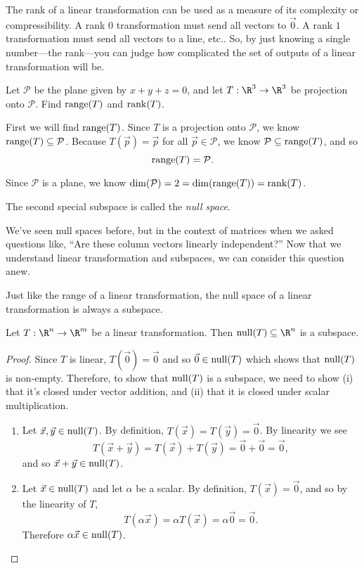The rank of a linear transformation can be used as a measure of
its complexity or compressibility. A rank $0$ transformation must send all vectors to $\vec 0$. A rank
$1$ transformation must send all vectors to a line, etc.. So, by just knowing a single number---the rank---you
can judge how complicated the set of outputs of a linear transformation will be.

\begin{example}
	Let $\mathcal P$ be the plane given by $x+y+z=0$, and let $T:\R^3\to\R^3$ be projection onto $\mathcal P$.
	Find $\operatorname{range}(T)$ and $\operatorname{rank}(T)$.

	First we will find $\operatorname{range}(T)$. Since $T$ is a projection onto $\mathcal P$, we know $\operatorname{range}(T)\subseteq \mathcal P$.
	Because $T(\vec p)=\vec p$ for all $\vec p\in \mathcal P$, we know $\mathcal P\subseteq \operatorname{range}(T)$, and so
	\[
		\operatorname{range}(T)=\mathcal P.
	\]

	Since $\mathcal P$ is a plane, we know $\operatorname{dim}(\mathcal P)=2=\operatorname{dim}(\operatorname{range}(T))=\operatorname{rank}(T)$.
\end{example}

The second special subspace is called the \emph{null space}.


We've seen null spaces before, but in the context of matrices when we asked questions like, ``Are these column vectors
linearly independent?'' Now that we understand linear transformation and subspaces,
we can consider this question anew.

Just like the range of a linear transformation, the null space of a linear transformation is always a subspace.

\begin{theorem}
	Let $T:\R^n\to\R^m$ be a linear transformation. Then $\Null(T)\subseteq \R^n$ is a subspace.
\end{theorem}
\begin{proof}
	Since $T$ is linear, $T(\vec 0)=\vec 0$ and so $\vec 0\in\operatorname{null}(T)$ which shows that $\operatorname{null}(T)$ is non-empty.
	Therefore, to show that $\operatorname{null}(T)$ is a subspace, we need to show (i) that it's closed under vector addition,
	and (ii) that it is closed under scalar multiplication.
	\begin{enumerate}[label=(\roman*)]
		\item Let $\vec x,\vec y\in\operatorname{null}(T)$.
			By definition, $T(\vec x)=T(\vec y)=\vec 0$. By linearity we see
			\[
				T(\vec x+\vec y)=T(\vec x)+T(\vec y)=\vec 0+\vec 0=\vec 0,
			\]
			and so $\vec x+\vec y\in\operatorname{null}(T)$.
		\item Let $\vec x\in\operatorname{null}(T)$ and let $\alpha$ be a scalar.
			By definition, $T(\vec x)=\vec 0$,
			and so by the linearity of $T$,
			\[
			T(\alpha\vec x)=\alpha T(\vec x)=\alpha\vec 0=\vec 0.
			\]
			Therefore $\alpha\vec x\in\operatorname{null}(T)$.
	\end{enumerate}
\end{proof}

